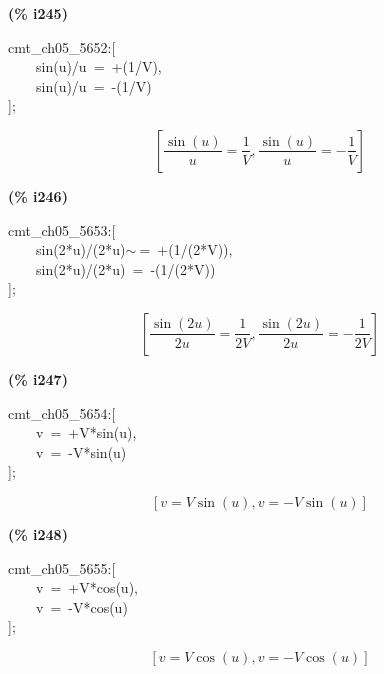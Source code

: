 \documentclass[fleqn]{article}
\begin{document}
\noindent
\begin{minipage}[t]{4.000000em}\color{red}\bfseries
(\% i245)	
\end{minipage}
\begin{minipage}[t]{\textwidth}\color{blue}
cmt\_ch05\_5652:[\\
\ \ \ \ sin(u)/u\ =\ +(1/V),\\
\ \ \ \ sin(u)/u\ =\ -(1/V)\\
];
\end{minipage}
\[\displaystyle \tag{\% o245} 
\left[ \frac{\sin{(u)}}{u}=\frac{1}{V}\operatorname{,}\frac{\sin{(u)}}{u}=-\frac{1}{V}\right] \mbox{}
\]


\noindent
\begin{minipage}[t]{4.000000em}\color{red}\bfseries
(\% i246)	
\end{minipage}
\begin{minipage}[t]{\textwidth}\color{blue}
cmt\_ch05\_5653:[\\
\ \ \ \ sin(2*u)/(2*u)\ensuremath{\sim\ }=\ +(1/(2*V)),\\
\ \ \ \ sin(2*u)/(2*u)\ =\ -(1/(2*V))\\
];
\end{minipage}
\[\displaystyle \tag{\% o246} 
\left[ \frac{\sin{\left( 2 u\right) }}{2 u}=\frac{1}{2 V}\operatorname{,}\frac{\sin{\left( 2 u\right) }}{2 u}=-\frac{1}{2 V}\right] \mbox{}
\]


\noindent
\begin{minipage}[t]{4.000000em}\color{red}\bfseries
(\% i247)	
\end{minipage}
\begin{minipage}[t]{\textwidth}\color{blue}
cmt\_ch05\_5654:[\\
\ \ \ \ v\ =\ +V*sin(u),\\
\ \ \ \ v\ =\ -V*sin(u)\\
];
\end{minipage}
\[\displaystyle \tag{\% o247} 
\left[ v=V \sin{(u)}\operatorname{,}v=-V \sin{(u)}\right] \mbox{}
\]


\noindent
\begin{minipage}[t]{4.000000em}\color{red}\bfseries
(\% i248)	
\end{minipage}
\begin{minipage}[t]{\textwidth}\color{blue}
cmt\_ch05\_5655:[\\
\ \ \ \ v\ =\ +V*cos(u),\\
\ \ \ \ v\ =\ -V*cos(u)\\
];
\end{minipage}
\[\displaystyle \tag{\% o248} 
\left[ v=V \cos{(u)}\operatorname{,}v=-V \cos{(u)}\right] \mbox{}
\]
\end{document}
